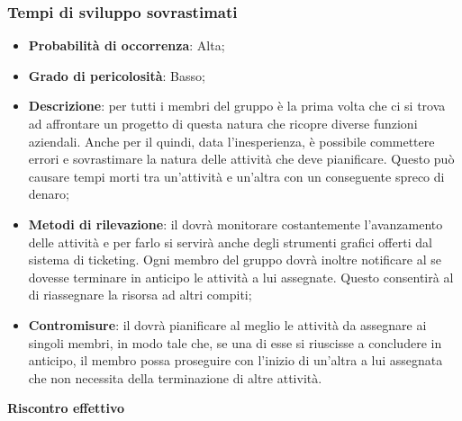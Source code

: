 
		\subsubsection{Tempi di sviluppo sovrastimati} %
		\label{ssub:tempi_di_sviluppo_sovrastimati}
			\begin{itemize}
				\item \textbf{Probabilità di occorrenza}: Alta;
				\item \textbf{Grado di pericolosità}: Basso;
				\item \textbf{Descrizione}: per tutti i membri del gruppo è la prima volta che ci si trova ad affrontare un progetto di questa natura che ricopre diverse funzioni aziendali. Anche per il \roleProjectManager{} quindi, data l'inesperienza, è possibile commettere errori e sovrastimare la natura delle attività che deve pianificare. Questo può causare tempi morti tra un'attività e un'altra con un conseguente spreco di denaro;
				\item \textbf{Metodi di rilevazione}: il \roleProjectManager{} dovrà monitorare costantemente l'avanzamento delle attività e per farlo si servirà anche degli strumenti grafici offerti dal sistema di ticketing. Ogni membro del gruppo dovrà inoltre notificare al \roleProjectManager{} se dovesse terminare in anticipo le attività a lui assegnate. Questo consentirà al \roleProjectManager{} di riassegnare la risorsa ad altri compiti;
				\item \textbf{Contromisure}: il \roleProjectManager{} dovrà pianificare al meglio le attività da assegnare ai singoli membri, in modo tale che, se una di esse si riuscisse a concludere in anticipo, il membro possa proseguire con l'inizio di un'altra a lui assegnata che non necessita della terminazione di altre attività.
			\end{itemize}
		\noindent
		\textbf{Riscontro effettivo}
